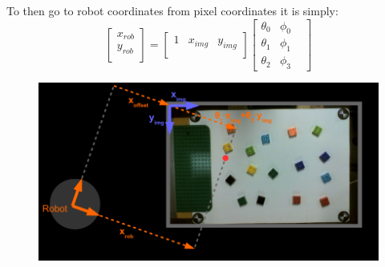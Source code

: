 To then go to robot coordinates from pixel coordinates it is simply:
\begin{equation}
\begin{bmatrix}
x_{rob} \\
y_{rob} \\
\end{bmatrix} 
= 
\begin{bmatrix}
1 & x_{img} & y_{img}\\
\end{bmatrix} 
\begin{bmatrix}
\theta_0 & \phi_0 & \\
\theta_1 & \phi_1 & \\
\theta_2 & \phi_3 &  
\end{bmatrix}  
\end{equation}

\begin{figure}[h]
\centering
\includegraphics[width=\textwidth]{figures/camera_robot_shortcut.PNG}
\caption{}
\label{fig:camera_robot_shortcut}
\end{figure}
